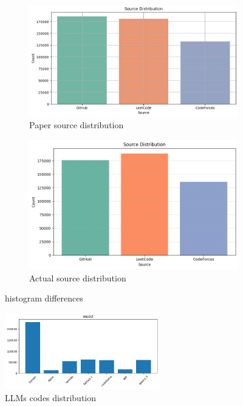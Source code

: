 \begin{figure}[h]
    \centering
    \begin{subfigure}[b]{0.45\textwidth}
        \centering
        \includegraphics[width=\linewidth]{img/CoDet-M4/origianl_histogram_source_distribution.jpeg}
        \caption{Paper source distribution}
        \label{fig:immagine1}
    \end{subfigure}
    \hfill
    \begin{subfigure}[b]{0.45\textwidth}
        \centering
        \includegraphics[width=\linewidth]{img/CoDet-M4/histogram_source_distribution_MY.png}
        \caption{Actual source distribution}
        \label{fig:immagine2}
    \end{subfigure}
    \caption{histogram differences}
    \label{fig:CoDet-M4_histogram_differences}
\end{figure}





\begin{figure}[H]
    \centering
    \includegraphics[width=0.6\textwidth]{img/CoDet-M4/models.png}
    \caption{LLMs codes distribution}
    \label{fig:LLMs_codes}
\end{figure}

